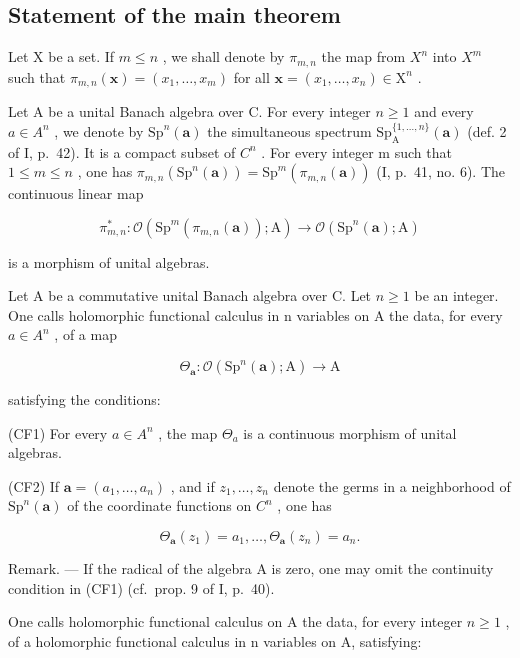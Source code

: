 \subsection{Statement of the main theorem}

Let X be a set. If \(m \leqslant n\) , we shall denote by \(\pi_{m,n}\) the map from \(X^{n}\) into \(X^{m}\) such that \(\pi_{m,n}(\boldsymbol{x}) = (x_{1}, \ldots, x_{m})\) for all \(\boldsymbol{x} = (x_{1}, \ldots, x_{n}) \in \mathrm{X}^{n}\) .

Let A be a unital Banach algebra over C. For every integer \(n \geqslant 1\) and every \(a \in A^{n}\) , we denote by \(\mathrm{Sp}^{n}(\boldsymbol{a})\) the simultaneous spectrum \(\mathrm{Sp}_{\mathrm{A}}^{\{1,\ldots,n\}}(\boldsymbol{a})\) (def. 2 of I, p.~42). It is a compact subset of \(C^{n}\) . For every integer m such that \(1 \leqslant m \leqslant n\) , one has \(\pi_{m,n}(\mathrm{Sp}^{n}(\boldsymbol{a})) = \mathrm{Sp}^{m}(\pi_{m,n}(\boldsymbol{a}))\) (I, p.~41, no. 6). The continuous linear map

\[
\pi_ {m, n} ^ {*} \colon \mathcal {O} (\mathrm{Sp} ^ {m} (\pi_ {m, n} (\boldsymbol {a})); \mathrm{A}) \longrightarrow \mathcal {O} (\mathrm{Sp} ^ {n} (\boldsymbol {a}); \mathrm{A})
\]

is a morphism of unital algebras.

Let A be a commutative unital Banach algebra over C. Let \(n \geqslant 1\) be an integer. One calls holomorphic functional calculus in n variables on A the data, for every \(a \in A^{n}\) , of a map

\[
\Theta_ {\boldsymbol {a}} \colon \mathcal {O} (\mathrm{Sp} ^ {n} (\boldsymbol {a}); \mathrm{A}) \longrightarrow \mathrm{A}
\]

satisfying the conditions:

(CF1) For every \(a \in A^{n}\) , the map \(\Theta_{a}\) is a continuous morphism of unital algebras.

(CF2) If \(\boldsymbol{a}=(a_{1},\ldots,a_{n})\) , and if \(z_{1},\ldots,z_{n}\) denote the germs in a neighborhood of \(\mathrm{Sp}^{n}(\boldsymbol{a})\) of the coordinate functions on \(C^{n}\) , one has

\[
\Theta_ {\boldsymbol {a}} (z _ {1}) = a _ {1}, \dots , \Theta_ {\boldsymbol {a}} (z _ {n}) = a _ {n}.
\]

Remark. --- If the radical of the algebra A is zero, one may omit the continuity condition in (CF1) (cf.~prop. 9 of I, p.~40).

One calls holomorphic functional calculus on A the data, for every integer \(n \geqslant 1\) , of a holomorphic functional calculus in n variables on A, satisfying:

